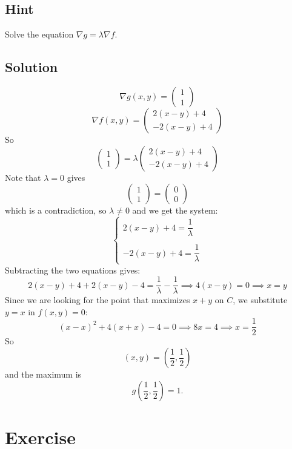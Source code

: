 \documentclass[a4paper,10pt]{article}
\begin{document}
\subsection{Hint}
Solve the equation $\nabla g = \lambda\nabla f$.

\subsection{Solution}
\[
    \nabla g(x,y) = \begin{pmatrix} 1 \\ 1 \end{pmatrix}
\]
\[
    \nabla f(x,y) = \begin{pmatrix} 2(x-y) + 4 \\ -2(x-y) + 4 \end{pmatrix}
\]
So
\[
    \begin{pmatrix} 1 \\ 1 \end{pmatrix} = \lambda \begin{pmatrix} 2(x-y) + 4 \\ -2(x-y) + 4 \end{pmatrix}
\]
Note that $\lambda = 0$ gives
\[
    \begin{pmatrix} 1 \\ 1 \end{pmatrix} = \begin{pmatrix} 0 \\ 0 \end{pmatrix}
\]
which is a contradiction, so $\lambda \neq 0$ and we get the system:
\[
    \begin{cases}
        2(x-y) + 4 = \dfrac{1}{\lambda} \\ \\
        -2(x-y) + 4 = \dfrac{1}{\lambda}
    \end{cases}
\]
Subtracting the two equations gives:
\[
    2(x-y) + 4 + 2(x-y) - 4 =  \frac{1}{\lambda} - \frac{1}{\lambda} \implies 4(x-y) = 0 \implies x = y
\]
Since we are looking for the point that maximizes $x+y$ on $C$, we substitute $y=x$ in $f(x,y)=0$:
\[
    (x-x)^2 + 4(x+x) - 4 = 0 \implies 8x = 4 \implies x = \frac{1}{2}
\]
So
\[
    (x, y) = \left(\frac{1}{2}, \frac{1}{2}\right)
\]
and the maximum is
\[
    g\left(\frac{1}{2}, \frac{1}{2}\right) = 1.
\]

\clearpage

\section{Exercise}
\end{document}
